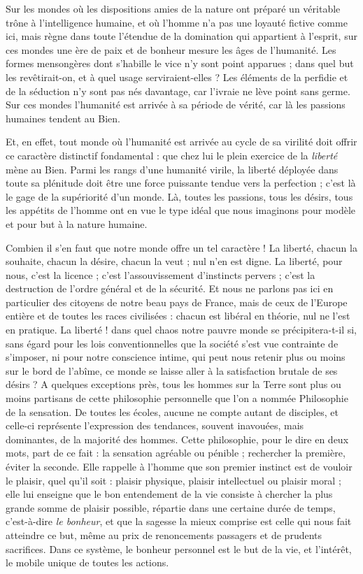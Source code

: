 \documentclass[a4paper, 11pt, oneside]{article}
\begin{document}
Sur les mondes où les dispositions amies de la nature ont préparé un véritable trône à l'intelligence humaine, et où l'homme n'a pas une loyauté fictive comme ici, mais règne dans toute l'étendue de la domination qui appartient à l'esprit, sur ces mondes une ère de paix et de bonheur mesure les âges de l'humanité. Les formes mensongères dont s'habille le vice n'y sont point apparues ; dans quel but les revêtirait-on, et à quel usage serviraient-elles ? Les éléments de la perfidie et de la séduction n'y sont pas nés davantage, car l'ivraie ne lève point sans germe. Sur ces mondes l'humanité est arrivée à sa période de vérité, car là les passions humaines tendent au Bien.

Et, en effet, tout monde où l'humanité est arrivée au cycle de sa virilité doit offrir ce caractère distinctif fondamental : que chez lui le plein exercice de la \emph{liberté} mène au Bien. Parmi les rangs d'une humanité virile, la liberté déployée dans toute sa plénitude doit être une force puissante tendue vers la perfection ; c'est là le gage de la supériorité d'un monde. Là, toutes les passions, tous les désirs, tous les appétits de l'homme ont en vue le type idéal que nous imaginons pour modèle et pour but à la nature humaine.

Combien il s'en faut que notre monde offre un tel caractère ! La liberté, chacun la souhaite, chacun la désire, chacun la veut ; nul n'en est digne. La liberté, pour nous, c'est la licence ; c'est l'assouvissement d'instincts pervers ; c'est la destruction de l'ordre général et de la sécurité. Et nous ne parlons pas ici en particulier des citoyens de notre beau pays de France, mais de ceux de l'Europe entière et de toutes les races civilisées : chacun est libéral en théorie, nul ne l'est en pratique. La liberté ! dans quel chaos notre pauvre monde se précipitera-t-il si, sans égard pour les lois conventionnelles que la société s'est vue contrainte de s'imposer, ni pour notre conscience intime, qui peut nous retenir plus ou moins sur le bord de l'abîme, ce monde se laisse aller à la satisfaction brutale de ses désirs ? A quelques exceptions près, tous les hommes sur la Terre sont plus ou moins partisans de cette philosophie personnelle que l'on a nommée Philosophie de la sensation. De toutes les écoles, aucune ne compte autant de disciples, et celle-ci représente l'expression des tendances, souvent inavouées, mais dominantes, de la majorité des hommes. Cette philosophie, pour le dire en deux mots, part de ce fait : la sensation agréable ou pénible ; rechercher la première, éviter la seconde. Elle rappelle à l'homme que son premier instinct est de vouloir le plaisir, quel qu'il soit : plaisir physique, plaisir intellectuel ou plaisir moral ; elle lui enseigne que le bon entendement de la vie consiste à chercher la plus grande somme de plaisir possible, répartie dans une certaine durée de temps, c'est-à-dire \emph{le bonheur}, et que la sagesse la mieux comprise est celle qui nous fait atteindre ce but, même au prix de renoncements passagers et de prudents sacrifices. Dans ce système, le bonheur personnel est le but de la vie, et l'intérêt, le mobile unique de toutes les actions.
\end{document}
